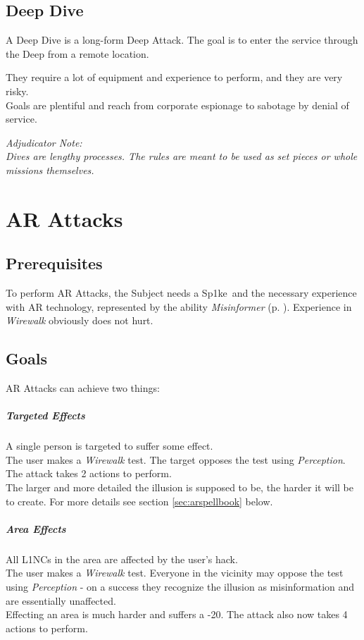 \documentclass[12pt,a4paper,openany,usenames,dvipsnames]{book}
\def\modifiedlincname{Sp1ke}
\def\hackingskill{Wirewalk}
\begin{document}
	\section{Deep Dive}
	A Deep Dive is a long-form Deep Attack.
	The goal is to enter the service through the Deep from a remote location.
	\par
	They require a lot of equipment and experience to perform, and they are very risky.
	\\%
	Goals are plentiful and reach from corporate espionage to sabotage by denial of service.
	\begin{exampleblock}
		\itshape
		Adjudicator Note:
		\\%
		Dives are lengthy processes.
		The rules are meant to be used as set pieces or whole missions themselves.
	\end{exampleblock}

	\chapter{AR Attacks}
	\section{Prerequisites}
	To perform AR Attacks, the Subject needs a \modifiedlincname\ and the necessary experience with AR technology,
		represented by the ability \emph{Misinformer} (p. \pageref{ability:misinformer}).
	Experience in \emph{\hackingskill} obviously does not hurt.
	\section{Goals}
	AR Attacks can achieve two things:
	\paragraph{Targeted Effects}
		A single person is targeted to suffer some effect.
		\\%
		The user makes a \emph{\hackingskill} test.
		The target opposes the test using \emph{Perception}.
		The attack takes 2 actions to perform.
		\\%
		The larger and more detailed the illusion is supposed to be, the harder it will be to create.
		For more details see section \ref{sec:arspellbook} below.
	\paragraph{Area Effects}
		All L1NCs in the area are affected by the user's hack.
		\\%
		The user makes a \emph{\hackingskill} test.
		Everyone in the vicinity may oppose the test using \emph{Perception}
			- on a success they recognize the illusion as misinformation and are essentially unaffected.
		\\%
		Effecting an area is much harder and suffers a -20.
		The attack also now takes 4 actions to perform.
\end{document}
